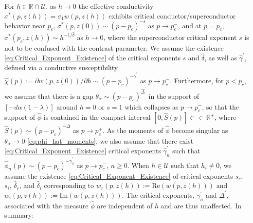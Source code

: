 \documentclass[english,12pt,jmp,graphicx]{revtex4-1}
\newcommand{\ph}{\hat{\phi}}
\newcommand{\gh}{\hat{\gamma}}
\newcommand{\Dh}{\hat{\Delta}}
\newcommand{\dha}{\hat{\delta}}
\begin{document}
For $h\in\mathbb{R}\cap\mathcal{U}$, as $h\to0$ the effective conductivity
$\sigma^*(p,z(h))=\sigma_1w(p,z(h))$ exhibits critical conductor/superconductor
behavior near $p_c$, $\sigma^*(p,z(0))\sim(p-p_c)^{-s}$ as $p\to p_c^-$, and at
$p=p_c$, $\sigma^*(p_c,z(h))\sim h^{-1/\dha}$ as $h\to0$, where the superconductor
critical exponent $s$ is not to be confused with the contrast
parameter. We assume the existence
\eqref{eq:Critical_Exponent_Existence} of the critical exponents $s$ and
$\dha$, as well as $\gh^\prime$, defined via a conductive susceptibility
$\hat{\chi}(p):=\partial w(p,z(0))/\partial h\sim(p-p_c)^{-\gh^\prime}$ as $p\to p_c^-$. Furthermore,
for $p<p_c$, we assume that there is a gap $\theta_\alpha\sim(p-p_c)^{\Dh^\prime}$ in the
support of $[-d\alpha(1-\lambda)]$ around $h=0$ or $s=1$ which collapses as
$p\to p_c^-$, so that the support of $\ph$ is contained in the compact
interval $[0,\hat{S}(p)]\subset\subset\mathbb{R}^+$, where
$\hat{S}(p)\sim(p-p_c)^{-\Delta}$ as $p\to p_c^+$. As the moments of $\ph$ become
singular as $\theta_\alpha\to0$ \eqref{eq:phi_hat_moments}, we also assume that
there exist \eqref{eq:Critical_Exponent_Existence} critical exponents
$\gh_n^\prime$ such that $\ph_n(p)\sim(p-p_c)^{-\gh_n^\prime}$ as $p\to p_c^-$, $n\geq0$. When
$h\in\mathcal{U}$ such that $h_i\neq0$, we assume the existence
\eqref{eq:Critical_Exponent_Existence} of critical 
exponents $s_r$, $s_i$, $\dha_r$, and $\dha_i$ corresponding to
$w_r(p,z(h)):=\text{Re}(w(p,z(h)))$ and
$w_i(p,z(h)):=\text{Im}(w(p,z(h)))$. The critical exponents, $\gamma_n^\prime$
and $\Delta^\prime$, associated with the measure $\ph$ are independent of $h$
and are thus unaffected. In summary: 
\end{document}
